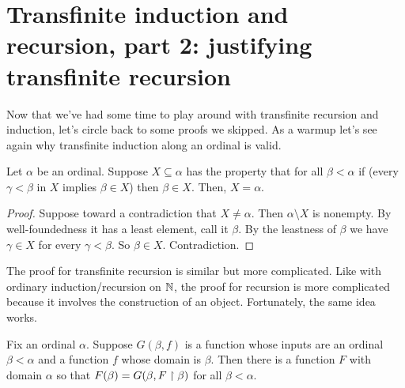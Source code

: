 \documentclass[10pt]{amsart}
\begin{document}
\newpage

\section{Transfinite induction and recursion, part 2: justifying transfinite recursion}


Now that we've had some time to play around with transfinite recursion and induction, let's circle back to some proofs we skipped. As a warmup let's see again why transfinite induction along an ordinal is valid.

\begin{theorem}
Let $\alpha$ be an ordinal. Suppose $X \subseteq \alpha$ has the property that for all $\beta < \alpha$ if (every $\gamma < \beta$ in $X$ implies $\beta \in X$) then $\beta \in X$. Then, $X = \alpha$.
\end{theorem}

\begin{proof}
Suppose toward a contradiction that $X \ne \alpha$. Then $\alpha \setminus X$ is nonempty. By well-foundedness it has a least element, call it $\beta$. By the leastness of $\beta$ we have $\gamma \in X$ for every $\gamma < \beta$. So $\beta \in X$. Contradiction.
\end{proof}

The proof for transfinite recursion is similar but more complicated. Like with ordinary induction/recursion on $\mathbb{N}$, the proof for recursion is more complicated because it involves the construction of an object. Fortunately, the same idea works.

\begin{theorem}
Fix an ordinal $\alpha$.
Suppose $G(\beta,f)$ is a function whose inputs are an ordinal $\beta < \alpha$ and a function $f$ whose domain is $\beta$. Then there is a function $F$ with domain $\alpha$ so that $F(\beta) = G(\beta, F \upharpoonright \beta)$ for all $\beta < \alpha$.
\end{theorem}
\end{document}
